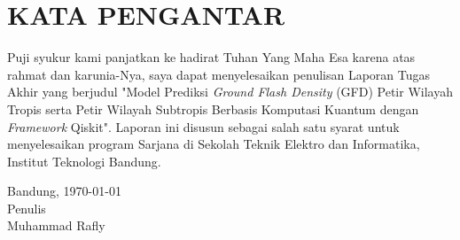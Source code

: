 \chapter*{KATA PENGANTAR}

Puji syukur kami panjatkan ke hadirat Tuhan Yang Maha Esa karena atas rahmat dan karunia-Nya, saya dapat menyelesaikan penulisan Laporan Tugas Akhir yang berjudul "Model Prediksi \textit{Ground Flash Density} (GFD) Petir Wilayah Tropis serta Petir Wilayah Subtropis Berbasis Komputasi Kuantum dengan \textit{Framework} Qiskit". Laporan ini disusun sebagai salah satu syarat untuk menyelesaikan program Sarjana di Sekolah Teknik Elektro dan Informatika, Institut Teknologi Bandung.
\begin{flushright}
    Bandung, \today\\
    
    Penulis \\
    \vspace{1cm}
    Muhammad Rafly
\end{flushright}
